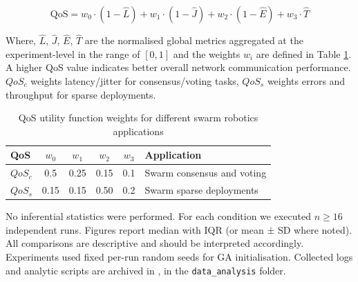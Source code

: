 \documentclass[conference]{IEEEtran}
\begin{document}
\begin{equation}
\mathrm{QoS} = w_0 \cdot (1 - \hat{L}) + w_1 \cdot (1 - \hat{J}) + w_2 \cdot (1 - \hat{E}) + w_3 \cdot \hat{T}
\end{equation}

Where, $\hat{L}$, $\hat{J}$, $\hat{E}$, $\hat{T}$ are the normalised global metrics aggregated at the experiment-level in the range of $[0,1]$ and the weights $w_i$ are defined in Table \ref{tab:qos}. A higher QoS value indicates better overall network communication performance. $QoS_c$ weights latency/jitter for consensus/voting tasks, $QoS_s$ weights errors and throughput for sparse deployments.

\begin{table}[H]
\centering
\caption{QoS utility function weights for different swarm robotics applications}
\label{tab:qos}
  \begin{tabular}{@{} lcccc p{3.5cm} @{}}
  \toprule
  \textbf{QoS} & \textbf{$w_0$} & \textbf{$w_1$} & \textbf{$w_2$} & \textbf{$w_3$} & \textbf{Application} \\
  \midrule
  $QoS_c$      & 0.5  & 0.25   & 0.15   & 0.1     & Swarm consensus and voting     \\
  $QoS_s$      & 0.15 & 0.15   & 0.50   & 0.2     & Swarm sparse deployments       \\
  \bottomrule
  \end{tabular}
\end{table}

No inferential statistics were performed. For each condition we executed $n\geq16$ independent runs. Figures report median with IQR (or mean ± SD where noted). All comparisons are descriptive and should be interpreted accordingly. Experiments used fixed per-run random seeds for GA initialisation. Collected logs and analytic scripts are archived in \cite{yallico_httpsgithubcomyallicorobotics_dissertation_2025}, in the \texttt{data\_analysis} folder. 
\end{document}
